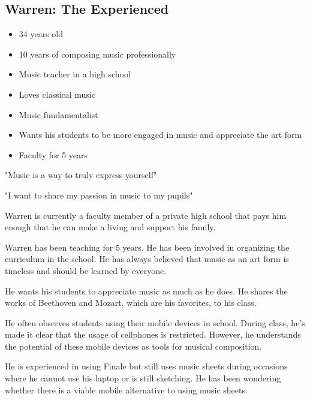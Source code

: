   \subsection{Warren: The Experienced}

  \begin{itemize}
  \item 34 years old
  \item 10 years of composing music professionally
  \item Music teacher in a high school
  \item Loves classical music
  \item Music fundamentalist
  \item Wants his students to be more engaged in music and appreciate the art form
  \item Faculty for 5 years
  \end{itemize}

  "Music is a way to truly express yourself"

  "I want to share my passion in music to my pupils"

  Warren is currently a faculty member of a private high school that pays him enough that he can make a living and support his family.

  Warren has been teaching for 5 years. He has been involved in organizing the curriculum in the school. He has always believed that music as an art form is timeless and should be learned by everyone.

  He wants his students to appreciate music as much as he does. He shares the works of Beethoven and Mozart, which are his favorites, to his class.


  He often observes students using their mobile devices in school. During class, he's made it clear that the usage of cellphones is restricted. However, he understands the potential of these mobile devices as tools for musical composition.


  He is experienced in using Finale but still uses music sheets during occasions where he cannot use his laptop or is still sketching. He has been wondering whether there is a viable mobile alternative to using music sheets.

